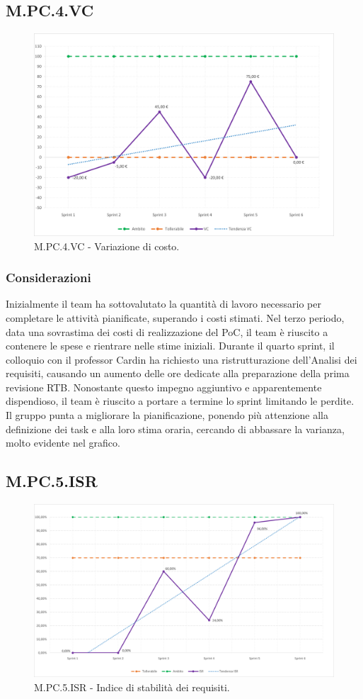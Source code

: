 \subsection{M.PC.4.VC}
\begin{figure}[H]
\includegraphics[width=15.5cm]{img/metriche/MPC4VC.png}
\caption{M.PC.4.VC - Variazione di costo.}
\end{figure}
\subsubsection{Considerazioni}
Inizialmente il team ha sottovalutato la quantità di lavoro necessario per completare le attività pianificate, superando i costi stimati.
Nel terzo periodo, data una sovrastima dei costi di realizzazione del PoC, il team è riuscito a contenere le spese e rientrare nelle stime iniziali.
Durante il quarto sprint, il colloquio con il professor Cardin ha richiesto una ristrutturazione dell'Analisi dei requisiti, causando un aumento delle ore dedicate alla preparazione della prima revisione RTB.
Nonostante questo impegno aggiuntivo e apparentemente dispendioso, il team è riuscito a portare a termine lo sprint limitando le perdite.
Il gruppo punta a migliorare la pianificazione, ponendo più attenzione alla definizione dei task e alla loro stima oraria, cercando di abbassare la varianza, molto evidente nel grafico. 
\subsection{M.PC.5.ISR}
\begin{figure}[H]
\includegraphics[width=15.5cm]{img/metriche/MPC5ISR.png}
\caption{M.PC.5.ISR - Indice di stabilità dei requisiti.}
\end{figure}
